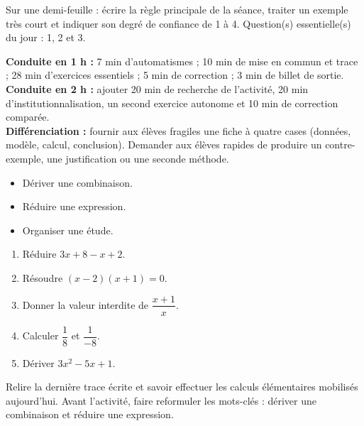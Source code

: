 \begin{exitticket}[3 minutes]Sur une demi-feuille : écrire la règle principale de la séance, traiter un exemple très court et indiquer son degré de confiance de 1 à 4. Question(s) essentielle(s) du jour : 1, 2 et 3.\end{exitticket}

\ifmxteacher
\begin{method}
\textbf{Conduite en 1 h :} 7 min d'automatismes ; 10 min de mise en commun et trace ; 28 min d'exercices essentiels ; 5 min de correction ; 3 min de billet de sortie.\\
\textbf{Conduite en 2 h :} ajouter 20 min de recherche de l'activité, 20 min d'institutionnalisation, un second exercice autonome et 10 min de correction comparée.\\
\textbf{Différenciation :} fournir aux élèves fragiles une fiche à quatre cases (données, modèle, calcul, conclusion). Demander aux élèves rapides de produire un contre-exemple, une justification ou une seconde méthode.
\end{method}
\fi
{}
\begin{objectives}\begin{itemize}\item Dériver une combinaison.\item Réduire une expression.\item Organiser une étude.\end{itemize}\end{objectives}
\begin{fluency}\begin{enumerate}\item Réduire $3x+8-x+2$. \item Résoudre $(x-2)(x+1)=0$. \item Donner la valeur interdite de $\dfrac{x+1}{x}$. \item Calculer $\dfrac1{8}$ et $\dfrac1{-8}$. \item Dériver $3x^2-5x+1$. \end{enumerate}\end{fluency}
\begin{prerequisites}Relire la dernière trace écrite et savoir effectuer les calculs élémentaires mobilisés aujourd'hui. Avant l'activité, faire reformuler les mots-clés : dériver une combinaison et réduire une expression.\end{prerequisites}

